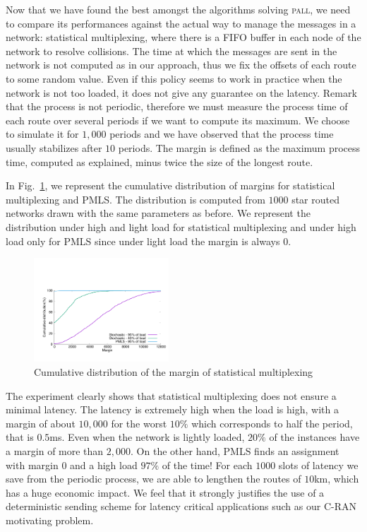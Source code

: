 \documentclass[10pt, conference, letterpaper]{IEEEtran}
\newcommand\pall{\textsc{pall}\xspace}
\begin{document}
     
     
     Now that we have found the best amongst the algorithms solving \pall, we need to compare its performances against the actual way to manage the messages in a network:  statistical multiplexing, where there is a FIFO buffer in each node of the network to resolve collisions. The time at which the messages are sent in the network is not computed as in our approach, thus we fix the offsets of each route to some random value.
     Even if this policy seems to work in practice when the network is not too loaded, it does not give any guarantee on the latency. Remark that the process is not periodic, therefore we must measure the process time of each route over several periods if we want to compute its maximum. We choose to simulate it for $1,000$ periods and we have observed that the process time usually stabilizes after $10$ periods. The margin is defined as the maximum process time, computed as explained, minus twice the size of the longest route. 
	    
     In Fig.~\ref{fig:sto}, we represent the cumulative distribution of margins for 
     statistical multiplexing and PMLS. The distribution is computed from $1000$ star routed networks drawn with the same parameters as before. We represent the distribution under high and light load for statistical multiplexing and under high load only for PMLS since under light load the margin is always $0$. 
     

    \begin{figure}
       \begin{center}
      \includegraphics[width = 0.45\textwidth]{stochastic.pdf}
      \end{center}
         \vspace{-0.5cm}
      \caption{Cumulative distribution of the margin of statistical multiplexing}
      \label{fig:sto}   
     \end{figure}    
     
     The experiment clearly shows that statistical multiplexing does not ensure a minimal latency. 
     The latency is extremely high when the load is high, with a margin of about $10,000$ for the worst $10\%$ which corresponds to half the period, that is $0.5$ms. Even when the network is lightly loaded, $20\%$ of the instances have a margin of more than $2,000$. On the other hand, PMLS finds an assignment with margin $0$ and a high load $97\%$ of the time! 
     For each $1000$ slots of latency we save from the periodic process, we are able to lengthen the routes of $10$km, which has a huge economic impact. We feel that it strongly justifies the use of a deterministic sending scheme for latency critical applications such as our C-RAN motivating problem.     
     
\end{document}
